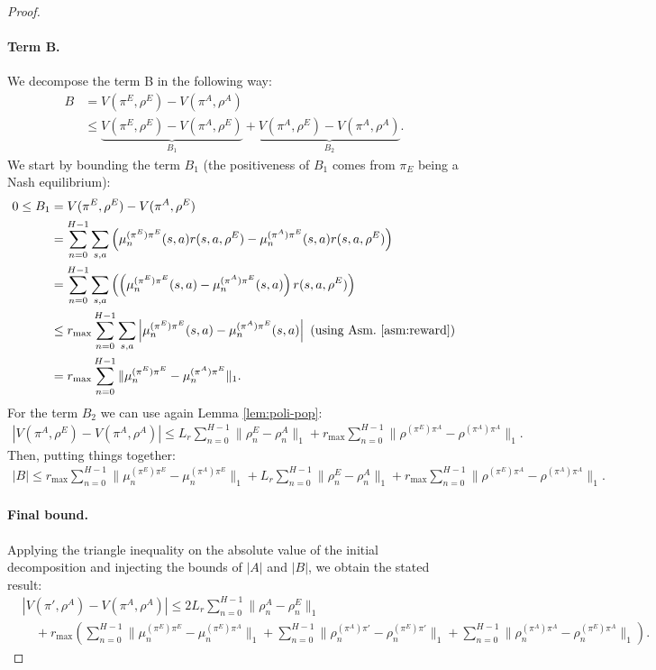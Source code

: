 \documentclass{article}
\begin{document}
\begin{proof}
\paragraph{Term B.} We decompose the term B in the following way:
\begin{align}
    B &= V(\pi^E, \rho^E) - V(\pi^A, \rho^A) \\
    &\le \underbrace{V(\pi^E, \rho^E) - V(\pi^A, \rho^E)}_{B_1} + \underbrace{V(\pi^A, \rho^E) - V(\pi^A, \rho^A)}_{B_2}.
\end{align}
We start by bounding the term $B_1$ (the positiveness of $B_1$ comes from $\pi_E$ being a Nash equilibrium):
\begin{align}
    0 \leq B_1 &= V(\pi^E, \rho^E) - V(\pi^A, \rho^E) \\
    &= \sum_{n=0}^{H-1} \sum_{s,a}\left(\mu^{(\pi^E)\pi^E}_n(s,a)r(s,a,\rho^E) - \mu^{(\pi^A)\pi^E}_n(s,a)r(s,a,\rho^E)\right) \\
    & = \sum_{n=0}^{H-1} \sum_{s,a}\left(\left(\mu^{(\pi^E)\pi^E}_n(s,a) - \mu^{(\pi^A)\pi^E}_n(s,a)\right)r(s,a,\rho^E)\right) \\
    &\le r_{\max}\sum_{n=0}^{H-1} \sum_{s,a}\left|\mu^{(\pi^E)\pi^E}_n(s,a) - \mu^{(\pi^A)\pi^E}_n(s,a)\right| \text{ (using Asm.~\ref{asm:reward})} \\
    & = r_{\max}\sum_{n=0}^{H-1}\|\mu^{(\pi^E)\pi^E}_n - \mu^{(\pi^A)\pi^E}_n\|_1.
\end{align}
For the term $B_2$ we can use again Lemma \ref{lem:poli-pop}:
\begin{align}
   | V(\pi^A, \rho^E) - V(\pi^A, \rho^A) | \le L_r \sum_{n=0}^{H-1}\|\rho^E_n - \rho^A_n\|_1 + r_{\max}\sum_{n=0}^{H-1}\|\rho^{(\pi^E)\pi^A} - \rho^{(\pi^A)\pi^A}\|_1. 
\end{align}
Then, putting things together:
\begin{align*}
    |B| \le r_{\max}\sum_{n=0}^{H-1}\|\mu^{(\pi^E)\pi^E}_n - \mu^{(\pi^A)\pi^E}_n\|_1 + L_r \sum_{n=0}^{H-1}\|\rho^E_n - \rho^A_n\|_1 + r_{\max}\sum_{n=0}^{H-1}\|\rho^{(\pi^E)\pi^A} - \rho^{(\pi^A)\pi^A}\|_1. 
\end{align*}
%
\paragraph{Final bound.}
Applying the triangle inequality on the absolute value of the initial decomposition and injecting the bounds of $|A|$ and $|B|$, we obtain the stated result:
    \begin{align}
        &|V(\pi',\rho^A) - V(\pi^A,\rho^A)| 
        \leq
        2 L_r \sum_{n=0}^{H-1}  \|\rho_n^A - \rho_n^E\|_1
        \\
        &\quad  
        + r_\text{max} \left(\sum_{n=0}^{H-1} \|\mu_n^{(\pi^E)\pi^E} - \mu_n^{(\pi^E)\pi^A}\|_1
        +   \sum_{n=0}^{H-1} \|\rho_n^{(\pi^A)\pi'} - \rho_n^{(\pi^E)\pi'}\|_1
        +   \sum_{n=0}^{H-1} \|\rho_n^{(\pi^A)\pi^A} - \rho_n^{(\pi^E)\pi^A}\|_1\right).
    \end{align}
\end{proof}
\end{document}
